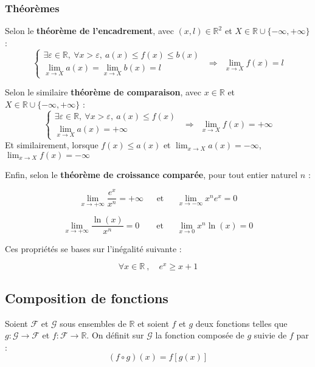 \documentclass{report}
\newcommand{\R}{\mathbb{R}}
\begin{document}
    \subsubsection{Théorèmes}

    Selon le \textbf{théorème de l'encadrement}, avec $(x,l)\in\mathbb{R}^2$ et $X\in\mathbb{R}\cup\{-\infty,+\infty\}$ : 
    \[
      \begin{cases} \exists \varepsilon \in \mathbb{R}, ~\forall x > \varepsilon,~ a(x)\le f(x) \le b(x) \\ \lim_{x\to X} a(x) = \lim_{x\to X} b(x) = l \end{cases} ~~ \Rightarrow ~~\lim_{x\to X} f(x) = l
    \]
    \newline

    Selon le similaire \textbf{théorème de comparaison}, avec $x\in\mathbb{R}$ et $X\in\mathbb{R}\cup\{-\infty,+\infty\}$ : 
    \[
      \begin{cases} \exists \varepsilon \in \mathbb{R}, ~\forall x > \varepsilon,~ a(x)\le f(x)\\ \lim_{x\to X} a(x) = +\infty \end{cases} ~~ \Rightarrow ~~\lim_{x\to X} f(x) = +\infty
    \]
    Et similairement, lorsque $f(x)\le a(x)$ et $\lim_{x\to X} a(x) = -\infty$, $\lim_{x\to X} f(x) = -\infty$ 
    \newline

    Enfin, selon le \textbf{théorème de croissance comparée}, pour tout entier naturel $n$ : 

    \[
    \lim_{x \to +\infty} \frac{e^x}{x^n} = +\infty ~~~~~~~ \text{et} ~~~~~~~ \lim_{x \to -\infty} x^n e^x = 0
    \]

    \[
      \lim_{x \to +\infty} \frac{\ln(x)}{x^n} = 0 ~~~~~~~~~ \text{et} ~~~~~~~ \lim_{x \to 0} x^n \ln(x) = 0
    \]


    Ces propriétés se bases sur l'inégalité suivante : 

    \[\forall x \in \R ~ , \quad e^x \ge x+1\]


    \subsection{Composition de fonctions}

      Soient $\mathcal{F}$ et $\mathcal{G}$ sous ensembles de $\R$ et soient $f$ et $g$ deux fonctions telles que $g : \mathcal{G} \to \mathcal{F}$ et $f : \mathcal{F} \to \mathbb{R}$. On définit sur $\mathcal{G}$ la fonction composée de $g$ suivie de $f$ par : 
      \[(f \circ g)(x) = f[g(x)]\]
\end{document}
